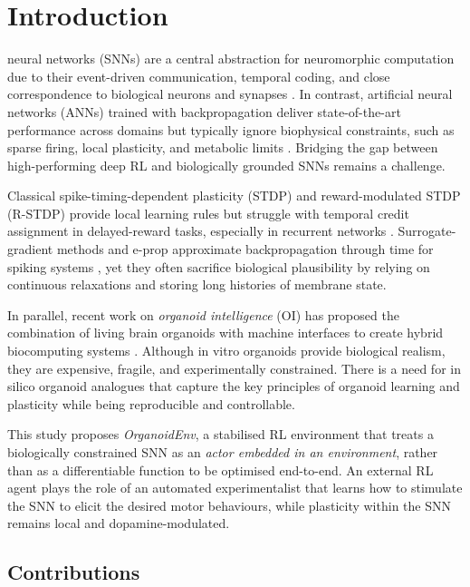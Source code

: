 \documentclass[journal]{IEEEtran}
\begin{document}
\section{Introduction}

 neural networks (SNNs) are a central abstraction for neuromorphic computation due to their event-driven communication, temporal coding, and close correspondence to biological neurons and synapses \cite{Izhikevich2003simple,NeuromorphicReview2019}. 
In contrast, artificial neural networks (ANNs) trained with backpropagation deliver state-of-the-art performance across domains but typically ignore biophysical constraints, such as sparse firing, local plasticity, and metabolic limits \cite{Mnih2015human}. 
Bridging the gap between high-performing deep RL and biologically grounded SNNs remains a challenge.

Classical spike-timing-dependent plasticity (STDP) and reward-modulated STDP (R-STDP) provide local learning rules but struggle with temporal credit assignment in delayed-reward tasks, especially in recurrent networks \cite{Florian2007rstdp,FarriesFairhall2007}. 
Surrogate-gradient methods and e-prop approximate backpropagation through time for spiking systems \cite{Bellec2018l2l,DirectTrainingSNN2024}, yet they often sacrifice biological plausibility by relying on continuous relaxations and storing long histories of membrane state.

In parallel, recent work on \emph{organoid intelligence} (OI) has proposed the combination of living brain organoids with machine interfaces to create hybrid biocomputing systems \cite{Smirnova2023OI,Hartung2023OIworkshop}. 
Although in vitro organoids provide biological realism, they are expensive, fragile, and experimentally constrained. 
There is a need for in silico organoid analogues that capture the key principles of organoid learning and plasticity while being reproducible and controllable.

This study proposes \emph{OrganoidEnv}, a stabilised RL environment that treats a biologically constrained SNN as an \emph{actor embedded in an environment}, rather than as a differentiable function to be optimised end-to-end. 
An external RL agent plays the role of an automated experimentalist that learns how to stimulate the SNN to elicit the desired motor behaviours, while plasticity within the SNN remains local and dopamine-modulated.

\subsection{Contributions}
\end{document}
